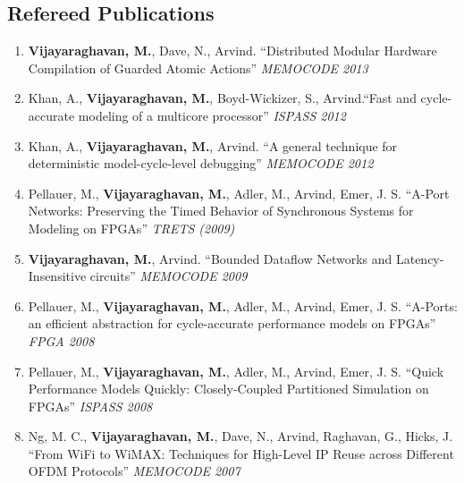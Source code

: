 \documentclass[margin,line]{resume}
\begin{document}
\begin{resume}
    \section{\mysidestyle Refereed Publications}
    \begin{enumerate}
    \item \textbf{Vijayaraghavan, M.}, Dave, N., Arvind.
    ``Distributed Modular Hardware Compilation of Guarded Atomic Actions'' \textit{MEMOCODE 2013}
    \item Khan, A., \textbf{Vijayaraghavan, M.}, Boyd-Wickizer, S., Arvind.``Fast and cycle-accurate modeling of 
    a multicore processor''
    \textit {ISPASS 2012}
    \item Khan, A., \textbf{Vijayaraghavan, M.}, Arvind. ``A general technique for deterministic model-cycle-level debugging''
    \textit{MEMOCODE 2012}
    \item Pellauer, M., \textbf{Vijayaraghavan, M.}, Adler, M., Arvind, Emer, J. S.
    ``A-Port Networks: Preserving the Timed Behavior of Synchronous Systems for
    Modeling on FPGAs'' \textit{TRETS (2009)}
    \item \textbf{Vijayaraghavan, M.}, Arvind. ``Bounded Dataflow Networks and
    Latency-Insensitive circuits'' \textit{MEMOCODE 2009}
    \item Pellauer, M.,
    \textbf{Vijayaraghavan, M.}, Adler, M., Arvind, Emer, J. S. ``A-Ports: an
    efficient abstraction for cycle-accurate performance models on FPGAs''
    \textit{FPGA 2008}
    \item Pellauer, M., \textbf{Vijayaraghavan, M.}, Adler, M., Arvind, Emer,
    J. S. ``Quick Performance Models Quickly: Closely-Coupled Partitioned
    Simulation on FPGAs'' \textit{ISPASS 2008}
    \item Ng, M. C., \textbf{Vijayaraghavan, M.}, Dave, N., Arvind, Raghavan, G., Hicks, J. ``From WiFi to WiMAX: Techniques for High-Level IP Reuse across Different OFDM Protocols'' \textit{MEMOCODE 2007}
    \end{enumerate}


\end{resume}
\end{document}
